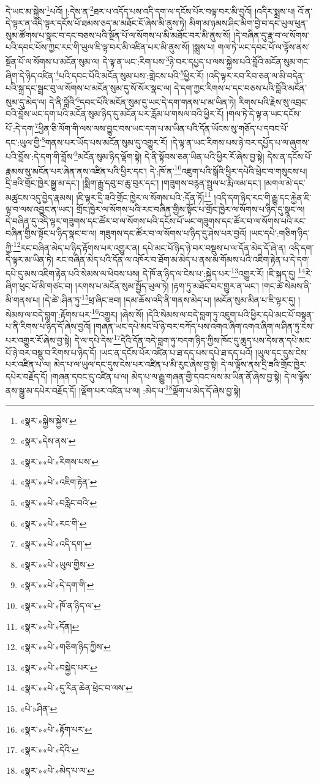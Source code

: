 དེ་ཡང་མ་སྐྱེས་\footnote{«སྣར་»སྐྱེས་སྐྱེས་}པའོ། །:དེས་ན་\footnote{«སྣར་»དེས་ནས་}ཐར་པ་འདོད་པས་འདི་དག་ལ་དངོས་པོར་བལྟ་བར་མི་བྱའོ། །འདིར་སྨྲས་པ། འོ་ན་དེ་ལྟར་ན་འདི་ལྟར་དངོས་པོ་ཐམས་ཅད་མ་མཐོང་ངོ་ཞེས་མི་ནུས་ཏེ། མིག་མ་ཉམས་ཤིང་མིག་བྱེ་བ་དང་ཡུལ་ཕུན་སུམ་ཚོགས་པ་སྣང་བ་དང་བཅས་པའི་སྔོན་པོ་ལ་སོགས་པ་མི་མཐོང་བར་མི་ནུས་སོ། །དེ་བཞིན་དུ་རྣ་བ་ལ་སོགས་པའི་དབང་པོས་ཀྱང་རང་གི་ཡུལ་ཇི་ལྟ་བར་མི་འཛིན་པར་མི་ནུས་སོ། །སྨྲས་པ། གལ་ཏེ་ཡང་དབང་པོ་ལ་ལྟོས་ནས་སྔོན་པོ་ལ་སོགས་པ་མངོན་སུམ་ལ། དེ་ལྟ་ན་ཡང་:རིག་པས་\footnote{«སྣར་»«པེ་»རིགས་པས་}ཉེ་བར་དཔྱད་པ་ལས་སྐྱེས་པའི་བློའི་མངོན་སུམ་གང་ཞིག་དེ་ཉིད་འཛིན་\footnote{«སྣར་»«པེ་»འཇིག་རྟེན་}པའི་དབང་པོའི་མངོན་སུམ་པས་:གླེངས་པའི་\footnote{«སྣར་»«པེ་»བརླིང་བའི་}ཕྱིར་རོ། །འདི་ལྟར་རབ་རིབ་ཅན་ལ་མི་བདེན་པའི་སྐྲ་དང་སྦྲང་བུ་ལ་སོགས་པ་མངོན་སུམ་དུ་སོ་སོར་སྣང་ལ། དེ་དག་ཀྱང་རིགས་པ་དང་བཅས་པའི་བློའི་མངོན་སུམ་དུ་མེད་ལ། དེ་ནི་བློའི་\footnote{«སྣར་»«པེ་»རང་གི་}དབང་པོའི་མངོན་སུམ་དུ་ཡང་དེ་དག་གནས་པ་མ་ཡིན་ཏེ། རིགས་པའི་རྗེས་སུ་འབྲང་བའི་བློས་ཡང་དག་པའི་མངོན་སུམ་ཉིད་དུ་མངོན་པར་རློམ་པ་གསལ་བའི་ཕྱིར་རོ། །གལ་ཏེ་དེ་ལྟ་ན་ཡང་དངོས་པོ་:དེ་དག་\footnote{«སྣར་»«པེ་»འདི་དག་}ཕྱིན་ཅི་ལོག་གི་ལས་ལས་བྱུང་བས་ཡང་དག་པ་མ་ཡིན་པའི་དོན་ཡོངས་སུ་གཅོད་པ་དབང་པོ་དང་:ཡུལ་གྱི་\footnote{«སྣར་»«པེ་»ཡུལ་གྱིས་}གནས་པར་ཡོད་པས་མངོན་སུམ་དུ་འགྱུར་རོ། །དེ་ལྟ་ན་ཡང་རིགས་པས་ཉེ་བར་དཔྱོད་པ་ལ་ཞུགས་པའི་བློས་:དེ་དག་གི་བློས་\footnote{«སྣར་»«པེ་»དེ་དག་གི་}མངོན་སུམ་ཉིད་ལྡོག་སྟེ། དེ་ནི་སྟོབས་ཅན་ཡིན་པའི་ཕྱིར་རོ་ཞེས་བྱ་སྟེ། དེས་ན་དངོས་པོ་རྣམས་སུ་མངོན་པར་ཞེན་ནས་འཛིན་པའི་ཕྱིར་དང་། དེ་:ཁོ་ན་\footnote{«སྣར་»«པེ་»ཁོ་ན་ཉིད་ལ་}འཇུག་པའི་སྒོའི་ཕྱིར་དཔེའི་ཕྲེང་བ་གསུངས་པ། དྲི་ཟའི་གྲོང་ཁྱེར་སྒྱུ་མ་དང་། །སྨིག་རྒྱུ་དབུ་བ་ཆུ་བུར་དང་། །གཟུགས་བརྙན་སྤྲུལ་པ་རྨི་ལམ་དང་། །མགལ་མེ་དང་མཚུངས་འདུ་བྱེད་རྣམས། །ཇི་ལྟར་དྲི་ཟའི་གྲོང་ཁྱེར་ལ་སོགས་པའི་:དོན་ཏོ།\footnote{«སྣར་»«པེ་»དོན།} །འདི་དག་ཉིད་རང་གི་རྒྱུ་དང་རྐྱེན་ཇི་ལྟ་བ་ལས་འབྱུང་ན་ཡང་། གྲོང་ཁྱེར་ལ་སོགས་པའི་རང་བཞིན་གྱིས་སྟོང་པ་གྲོང་ཁྱེར་ལ་སོགས་པ་ཉིད་དུ་སྣང་ལ། དེ་བཞིན་དུ་འདི་ལྟར་གཟུགས་དང་ཚོར་བ་ལ་སོགས་པའི་དངོས་པོ་ཡང་གཟུགས་དང་ཚོར་བ་ལ་སོགས་པའི་རང་བཞིན་གྱིས་སྟོང་པ་ཉིད་སྣང་བ་ལ། གཟུགས་དང་ཚོར་བ་ལ་སོགས་པ་ཉིད་དུ་ཤེས་པར་བྱའོ། །ཡང་དཔེ་:གཅིག་ཉིད་ཀྱི་\footnote{«སྣར་»«པེ་»གཅིག་ཉིད་ཀྱིས་}རང་བཞིན་མེད་པ་ཉིད་རྟོགས་པར་འགྱུར་ན། དཔེ་མང་པོ་ཉིད་ཉེ་བར་བསྡུས་པ་ལ་དོན་མེད་དོ་ཞེ་ན། འདི་དག་དེ་ལྟར་མ་ཡིན་ཏེ། རང་བཞིན་མེད་པའི་དོན་ལ་འཁོར་བ་ཐོག་མ་མེད་པ་ནས་མ་གོམས་པའི་འཇིག་རྟེན་པ་དེ་དག་དཔེ་དུ་མས་འཇིག་རྟེན་པའི་སེམས་ལ་ཕེབས་པས། དེ་ཁོ་ན་ཉིད་ལ་ངེས་པ་:སྐྱེད་པར་\footnote{«སྣར་»«པེ་»བསྐྱེད་པར་}འགྱུར་རོ། །ཇི་སྐད་དུ། \footnote{«སྣར་»«པེ་»དུ་རིན་ཆེན་ཕྲེང་བ་ལས་}རེ་ཞིག་ཕུང་པོ་མི་གཙང་བ། །རགས་པ་མངོན་སུམ་སྤྱོད་ཡུལ་ཏེ། །རྟག་ཏུ་མཐོང་བར་གྱུར་ན་ཡང་། །གང་ཚེ་སེམས་ནི་མི་གནས་པ། །དེ་ཚེ་:ཤིན་ཏུ་\footnote{«པེ་»ཤིན་}ཕྲ་ཞིང་ཟབ། །དམ་ཆོས་འདི་ནི་གནས་མེད་པ། །མངོན་སུམ་མིན་པ་ཇི་ལྟར་དུ། །སེམས་ལ་བདེ་བླག་:རྟོགས་པར་\footnote{«སྣར་»«པེ་»རྟོག་པར་}འགྱུར། །ཞེས་སོ། །དེའི་སེམས་ལ་བདེ་བླག་ཏུ་འཇུག་པའི་ཕྱིར་དཔེ་མང་པོ་བསྟན་པ་ནི་རིགས་པ་ཉིད་དོ་ཞེས་བྱའོ། །གཞན་ཡང་དཔེ་མང་པོ་ཉེ་བར་བཀོད་པས་འགའ་ཞིག་འགའ་ཞིག་ལ་ཤིན་ཏུ་ངེས་པར་འགྱུར་རོ་ཞེས་བྱ་སྟེ། དེ་ལ་དཔེ་དེས་\footnote{«སྣར་»«པེ་»དེའི་}དེའི་དོན་བདེ་བླག་ཏུ་བདག་ཉིད་ཀྱིས་ཁོང་དུ་ཆུད་པས་དེས་ན་དཔེ་མང་པོ་ཉེ་བར་བསྡུ་བ་རིགས་པ་ཉིད་དོ། །ཡང་ན་དངོས་པོར་འཛིན་པ་ཐ་དད་པས་དཔེ་ཐ་དད་པའོ། །ཡུལ་དང་དུས་ངེས་པར་འཛིན་པ་ལ། མེད་པ་ལ་ཡུལ་དང་དུས་ངེས་པར་འཛིན་པ་མི་རུང་ཞེས་བྱ་སྟེ། དེ་ལ་ལྟོས་ནས་དྲི་ཟའི་གྲོང་ཁྱེར་དཔེར་བརྗོད་དོ། །གཞན་དབང་དུ་འཛིན་པ་ལ། མེད་པ་ལ་རྒྱུ་གཞན་གྱི་དབང་ལས་མ་ཡིན་ནོ་ཞེས་བྱ་སྟེ། དེ་ལ་ལྟོས་ནས་སྒྱུ་མ་དཔེར་བརྗོད་དོ། །ལྡོག་པར་འཛིན་པ་ལ། :མེད་པ་\footnote{«སྣར་»«པེ་»མེད་པ་ལ་}ལྡོག་པ་མེད་དོ་ཞེས་བྱ་སྟེ། 